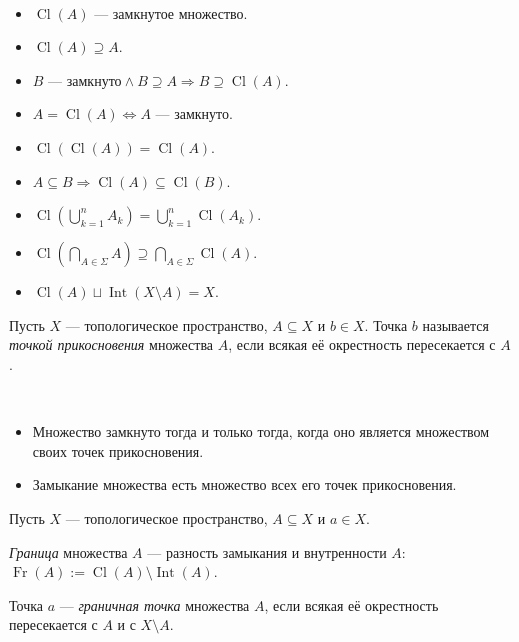 \documentclass[12pt,a4paper]{article}
\DeclareMathOperator{\Int}{Int}
\DeclareMathOperator{\Cl}{Cl}
\DeclareMathOperator{\Fr}{Fr}
\begin{document}
    \begin{theorem}\ 
        \begin{itemize}
            \item $\Cl(A)$ --- замкнутое множество.
            \item $\Cl(A) \supseteq A$.
            \item $B\text{ --- замкнуто} \wedge B \supseteq A \Rightarrow B \supseteq \Cl(A)$.
            \item $A = \Cl(A) \Leftrightarrow A \text{ --- замкнуто}$.
            \item $\Cl(\Cl(A)) = \Cl(A)$.
            \item $A \subseteq B \Rightarrow \Cl(A) \subseteq \Cl(B)$.
            \item $\Cl(\bigcup_{k=1}^n A_k) = \bigcup_{k=1}^n \Cl(A_k)$.
            \item $\Cl(\bigcap_{A \in \Sigma} A) \supseteq \bigcap_{A \in \Sigma} \Cl(A)$.
            \item $\Cl(A) \sqcup \Int(X \setminus A) = X$.
        \end{itemize}
    \end{theorem}

    \begin{definition}
        Пусть $X$ --- топологическое пространство, $A \subseteq X$ и $b \in X$. Точка $b$ называется \emph{точкой прикосновения} множества $A$, если всякая её окрестность пересекается с $A$.
    \end{definition}

    \begin{theorem}\ 
        \begin{itemize}
            \item Множество замкнуто тогда и только тогда, когда оно является множеством своих точек прикосновения.
            \item Замыкание множества есть множество всех его точек прикосновения.
        \end{itemize}
    \end{theorem}

    \begin{definition}
        Пусть $X$ --- топологическое пространство, $A \subseteq X$ и $a \in X$.

        \emph{Граница} множества $A$ --- разность замыкания и внутренности $A$: $\Fr(A) := \Cl(A) \setminus \Int(A)$.

        Точка $a$ --- \emph{граничная точка} множества $A$, если всякая её окрестность пересекается с $A$ и с $X \setminus A$.
    \end{definition}
\end{document}
